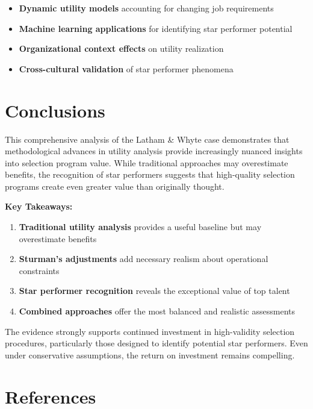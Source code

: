 \documentclass[
]{article}
\providecommand{\tightlist}{%
  \setlength{\itemsep}{0pt}\setlength{\parskip}{0pt}}
\begin{document}
\begin{itemize}
\tightlist
\item
  \textbf{Dynamic utility models} accounting for changing job
  requirements
\item
  \textbf{Machine learning applications} for identifying star performer
  potential\\
\item
  \textbf{Organizational context effects} on utility realization
\item
  \textbf{Cross-cultural validation} of star performer phenomena
\end{itemize}

\section{Conclusions}\label{conclusions}

This comprehensive analysis of the Latham \& Whyte case demonstrates
that methodological advances in utility analysis provide increasingly
nuanced insights into selection program value. While traditional
approaches may overestimate benefits, the recognition of star performers
suggests that high-quality selection programs create even greater value
than originally thought.

\textbf{Key Takeaways:}

\begin{enumerate}
\def\labelenumi{\arabic{enumi}.}
\tightlist
\item
  \textbf{Traditional utility analysis} provides a useful baseline but
  may overestimate benefits
\item
  \textbf{Sturman's adjustments} add necessary realism about operational
  constraints\\
\item
  \textbf{Star performer recognition} reveals the exceptional value of
  top talent
\item
  \textbf{Combined approaches} offer the most balanced and realistic
  assessments
\end{enumerate}

The evidence strongly supports continued investment in high-validity
selection procedures, particularly those designed to identify potential
star performers. Even under conservative assumptions, the return on
investment remains compelling.

\section{References}\label{references}
\end{document}
